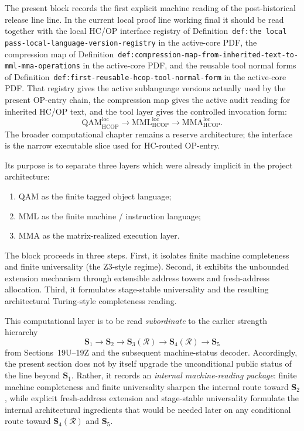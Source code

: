 \documentclass[12pt,a4paper]{article}
\DeclareRobustCommand{\QSCver}[1]{archival stage}
\renewcommand{\QSCver}[1]{historical release line}
\begin{document}
The present block records the first explicit machine reading of the post-\QSCver{legacy.31.0} line. 
In the current local proof line working final it should be read together with the local HC/OP interface registry of Definition~\texttt{def:the local pass-local-language-version-registry} in the active-core PDF, the compression map of Definition~\texttt{def:compression-map-from-inherited-text-to-mml-mma-operations} in the active-core PDF, and the reusable tool normal forms of Definition~\texttt{def:first-reusable-hcop-tool-normal-form} in the active-core PDF. That registry gives the active sublanguage versions actually used by the present OP-entry chain, the compression map gives the active audit reading for inherited HC/OP text, and the tool layer gives the controlled invocation form:
\[
 \mathrm{QAM}_{\mathrm{HCOP}}^{\mathrm{loc}}
 \to
 \mathrm{MML}_{\mathrm{HCOP}}^{\mathrm{loc}}
 \to
 \mathrm{MMA}_{\mathrm{HCOP}}^{\mathrm{loc}}.
\]
The broader computational chapter remains a reserve architecture; the interface is the narrow executable slice used for HC-routed OP-entry.

Its purpose is to separate three layers which were already implicit in the project architecture:
\begin{enumerate}[leftmargin=2em]
 \item QAM as the finite tagged object language;
 \item MML as the finite machine / instruction language;
 \item MMA as the matrix-realized execution layer.
\end{enumerate}

The block proceeds in three steps. First, it isolates finite machine completeness and finite universality (the Z3-style regime). Second, it exhibits the unbounded extension mechanism through extensible address towers and fresh-address allocation. Third, it formulates stage-stable universality and the resulting architectural Turing-style completeness reading.

This computational layer is to be read \emph{subordinate} to the earlier strength hierarchy
\[
\mathbf S_1\to \mathbf S_2\to \mathbf S_3(\mathcal R)\to \mathbf S_4(\mathcal R)\to \mathbf S_5
\]
from Sections~19U--19Z and the subsequent machine-status decoder. Accordingly, the present section does not by itself upgrade the unconditional public status of the line beyond \(\mathbf S_1\). Rather, it records an \emph{internal machine-reading package}: finite machine completeness and finite universality sharpen the internal route toward \(\mathbf S_2\), while explicit fresh-address extension and stage-stable universality formulate the internal architectural ingredients that would be needed later on any conditional route toward \(\mathbf S_4(\mathcal R)\) and \(\mathbf S_5\).
\end{document}
